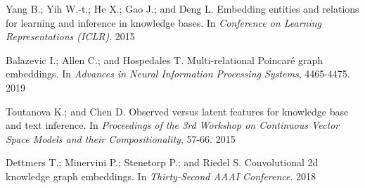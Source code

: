 \documentclass[9pt]{ctexart}
\theoremstyle{definition}
\begin{document}
\hypertarget{Yan15}{Yang B.; Yih W.-t.; He X.; Gao J.; and Deng L. Embedding entities and relations for learning and inference in knowledge bases. In \textit{Conference on Learning Representations (ICLR)}. 2015} 

\hypertarget{Bal19}{Balazevic I.; Allen C.; and Hospedales T. Multi-relational Poincaré graph embeddings. In \textit{Advances in Neural Information Processing Systems}, 4465-4475. 2019} 

\hypertarget{Tou15}{Toutanova K.; and Chen D. Observed versus latent features for knowledge base and text inference. In \textit{Proceedings of the 3rd Workshop on Continuous Vector Space Models and their Compositionality}, 57-66. 2015}

\hypertarget{Det18}{Dettmers T.; Minervini P.; Stenetorp P.; and Riedel S. Convolutional 2d knowledge graph embeddings. In \textit{Thirty-Second AAAI Conference}. 2018}
\end{document}
